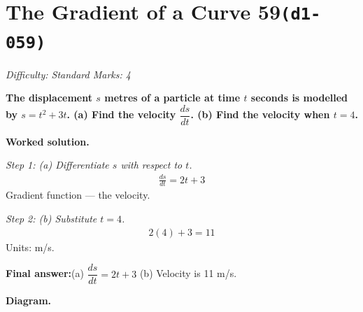\documentclass[11pt]{article}
\newcommand{\question}[1]{\par\medskip\noindent\textbf{#1}\par}
\begin{document}
\section*{The Gradient of a Curve 59\quad\small\texttt{(d1-059)}}
\textit{Difficulty: Standard \quad\textbar\quad Marks: 4}

\question{The displacement \( s \) metres of a particle at time \( t \) seconds is modelled by \( s = t^2 + 3t \). (a) Find the velocity \( \dfrac{ds}{dt} \). (b) Find the velocity when \( t = 4 \).}

\textbf{Worked solution.}

\textit{Step 1: (a) Differentiate \( s \) with respect to \( t \).}
\[\begin{gathered}
\frac{ds}{dt} = 2t + 3
\end{gathered}\]
Gradient function --- the velocity.

\textit{Step 2: (b) Substitute \( t = 4 \).}
\[\begin{gathered}
2(4) + 3 = 11
\end{gathered}\]
Units: m/s.

\begin{answerbox}
\textbf{Final answer:}\quad (a) \(\displaystyle  \dfrac{ds}{dt} = 2t + 3 \) \quad  (b) Velocity is 11 m/s.
\end{answerbox}
\textbf{Diagram.}
\end{document}
